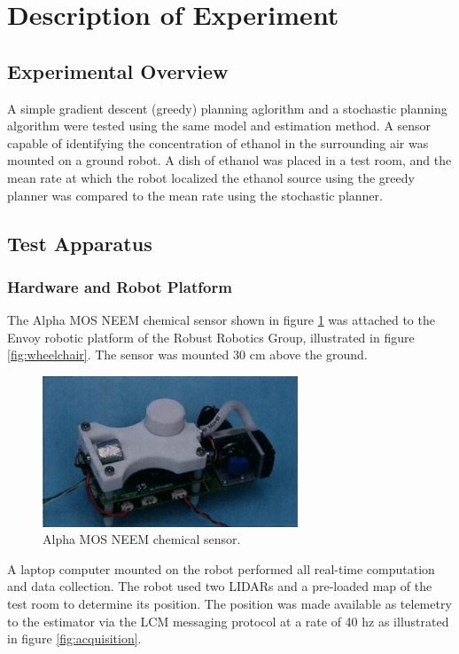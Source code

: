 \documentclass[submit, 12pt]{aiaa-pretty-modified}
\begin{document}
\section{Description of Experiment}
\subsection{Experimental Overview}
A simple gradient descent (greedy) planning aglorithm and a
stochastic planning algorithm were tested using the
same model and estimation method. A sensor capable of identifying the
concentration of ethanol in the surrounding air was mounted on a ground
robot. A dish of ethanol was placed in a test room, and the mean rate at which the robot localized the ethanol source
using the greedy planner was compared to the mean rate using the
stochastic planner.

\subsection{Test Apparatus}
\label{sec:design}
\subsubsection{Hardware and Robot Platform}

The Alpha MOS NEEM chemical sensor shown in figure \ref{fig:sensor} was
attached to the Envoy robotic platform of the Robust Robotics Group, illustrated in figure \ref{fig:wheelchair}.  The sensor was mounted
30 cm above the ground.


\begin{figure}
\begin{center}
\includegraphics[width=3in]{img/sensor.pdf}
\caption{Alpha MOS NEEM chemical sensor.}
\label{fig:sensor}
\end{center}
\end{figure}

A laptop computer
mounted on the robot performed all real-time computation and data
collection.  The robot used two LIDARs and a pre-loaded map of the
test room to determine its position.  The position was made available
as telemetry to the estimator via the LCM messaging protocol at a rate
of 40 hz as
illustrated in figure \ref{fig:acquisition}.
\end{document}
